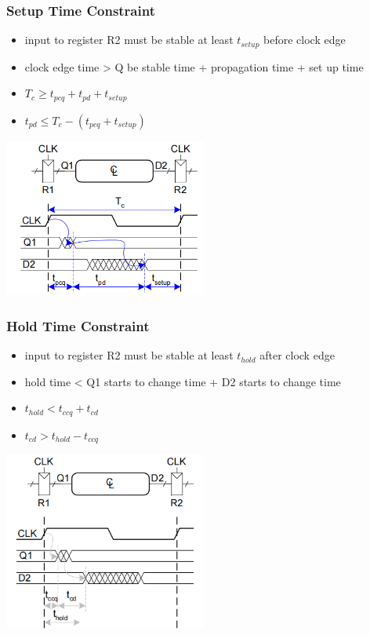 \documentclass[12pt]{article}
\begin{document}
\subsubsection{Setup Time Constraint}
\begin{itemize}
    \item input to register R2 must be stable at least $t_{setup}$ before clock edge
    \item clock edge time > Q be stable time + propagation time + set up time
    \item $T_c \geq t_{pcq} + t_{pd} + t_{setup}$
    \item $t_{pd} \leq T_c - (t_{pcq} + t_{setup})$
\end{itemize}
\includegraphics[width=0.5\textwidth]{ConstraintA.png}
\subsubsection{Hold Time Constraint}
\begin{itemize}
    \item input to register R2 must be stable at least $t_{hold}$ after clock edge
    \item hold time < Q1 starts to change time + D2 starts to change time
    \item $t_{hold} < t_{ccq} + t_{cd}$
    \item $t_{cd} > t_{hold} - t_{ccq}$
\end{itemize}
\includegraphics[width=0.5\textwidth]{ConstraintB.png}
\end{document}
